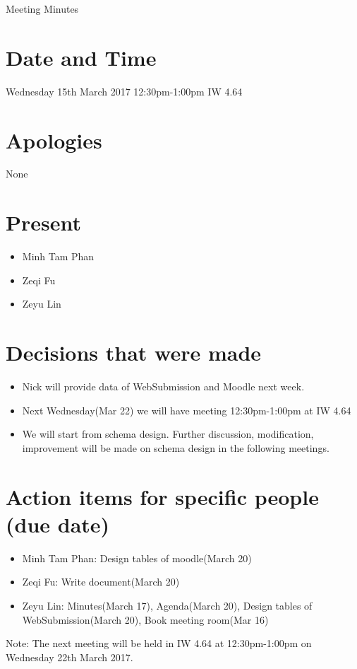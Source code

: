 \documentclass[11pt, a4paper]{article}
\begin{document}
\vspace*{15pt}

\begin{center}
\huge Meeting Minutes




\end{center}

\section{Date and Time}
 Wednesday 15th March 2017 12:30pm-1:00pm IW 4.64

\section{Apologies}
None

\section{Present}
\begin{itemize}
	\item Minh Tam Phan
	\item Zeqi Fu
	\item Zeyu Lin
\end{itemize}

\section{Decisions that were made}
\begin{itemize}
	\item Nick will provide data of WebSubmission and Moodle next week.
	\item Next Wednesday(Mar 22) we will have meeting 12:30pm-1:00pm at IW 4.64
	\item We will start from schema design. Further discussion, modification, improvement will be made on schema design in the following meetings.
\end{itemize}

\section{Action items for specific people (due date)}
\begin{itemize}
	\item Minh Tam Phan: Design tables of moodle(March 20)
	\item Zeqi Fu: Write document(March 20)
	\item Zeyu Lin: Minutes(March 17), Agenda(March 20), Design tables of WebSubmission(March 20), Book meeting room(Mar 16)
\end{itemize}



Note: The next meeting will be held in IW 4.64 at 12:30pm-1:00pm on Wednesday 22th March 2017.
\end{document}
